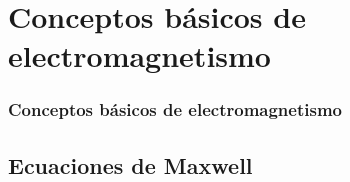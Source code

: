 \documentclass{beamer}
\begin{document}
\section{Conceptos básicos de electromagnetismo}
	
	
	\begin{frame}
		\frametitle{Conceptos básicos de electromagnetismo}
	\end{frame}
	
	\subsection{Ecuaciones de Maxwell} %
	
\end{document}
